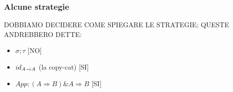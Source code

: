 \documentclass{beamer}
\newcommand{\limp}{\mathbin{{-}\mkern-3.5mu{\circ}}}
\begin{document}
\begin{frame}

	\frametitle{Alcune strategie}
	
	DOBBIAMO DECIDERE COME SPIEGARE LE STRATEGIE; QUESTE ANDREBBERO DETTE:
	\begin{itemize}
		\item $\sigma ; \tau$ [NO]
		\item $id_{A\limp A}$ (la copy-cat) [SI]
		\item $App:(A \Rightarrow B)\& A \Rightarrow B$ [SI]
	\end{itemize}

\end{frame}

% 	
% 	
% 
% 	
% 	
\end{document}
